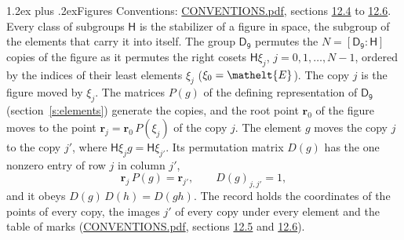 \documentclass[10pt,a4paper]{article}
\makeatletter
\renewcommand\section{\@startsection{section}{1}{\z@}{-3ex plus -1ex minus -.2ex}%
  {1.2ex plus .2ex}{\normalfont\large\sffamily\bfseries\color{parttitle}}}
\numberwithin{equation}{section}
\newcommand{\eltfont}[1]{{\let\sigma\eltsigma\mathelt{#1}}}
\newcommand{\grp}[1]{\mathsf{#1}}
\newcommand{\cls}[1]{\eltfont{#1}}
\newcommand{\pointr}{\mathbf{r}}
\makeatother
\begin{document}
\section{Figures}\label{s:permutation}
Conventions: \href{../../CONVENTIONS.pdf}{CONVENTIONS.pdf}, sections \href{../../CONVENTIONS.pdf\#conv.12.4}{12.4} to \href{../../CONVENTIONS.pdf\#conv.12.6}{12.6}.
Every class of subgroups $\grp{H}$ is the stabilizer of a figure in space, the subgroup of the elements that carry it into itself. \label{n:local.orbit.size}\label{n:element.coset.least}\label{n:index.coset}The group $\grp{D_{9}}$ permutes the $N = [\grp{D_{9}} : \grp{H}]$ copies of the figure as it permutes the right cosets $\grp{H}\xi_j$, $j = 0, 1, \dots, N - 1$, ordered by the indices of their least elements $\xi_j$ ($\xi_0 = \cls{E}$). The copy $j$ is the figure moved by $\xi_j$. The matrices $P(g)$ of the defining representation of $\grp{D_{9}}$ (section~\ref{s:elements}) generate the copies, and the root point $\pointr_0$ of the figure moves to the point $\pointr_j = \pointr_0\, P(\xi_j)$ of the copy $j$. \label{n:local.coset.image}The element $g$ moves the copy $j$ to the copy $j'$, where $\grp{H}\xi_j g = \grp{H}\xi_{j'}$. \label{n:local.matrix.permutation}Its permutation matrix $D(g)$ has the one nonzero entry of row $j$ in column $j'$,
\begin{equation}\label{e:perm.matrix}\pointr_j\, P(g) = \pointr_{j'}, \qquad D(g)_{j,j'} = 1,\end{equation}
and it obeys $D(g)\, D(h) = D(gh)$. The record holds the coordinates of the points of every copy, the images $j'$ of every copy under every element and the table of marks (\href{../../CONVENTIONS.pdf}{CONVENTIONS.pdf}, sections \href{../../CONVENTIONS.pdf\#conv.12.5}{12.5} and \href{../../CONVENTIONS.pdf\#conv.12.6}{12.6}).
\end{document}
